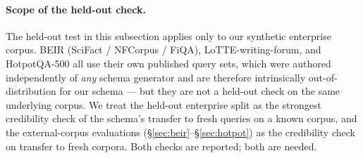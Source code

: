 \documentclass[11pt]{article}
\begin{document}
\paragraph{Scope of the held-out check.} The held-out test in this
subsection applies only to our synthetic enterprise corpus. BEIR
(SciFact / NFCorpus / FiQA), LoTTE-writing-forum, and HotpotQA-500
all use their own published query sets, which were authored
independently of \emph{any} schema generator and are therefore
intrinsically out-of-distribution for our schema --- but they are
not a held-out check on the same underlying corpus. We treat the
held-out enterprise split as the strongest credibility check of the
schema's transfer to fresh queries on a known corpus, and the
external-corpus evaluations (\S\ref{sec:beir}--\S\ref{sec:hotpot})
as the credibility check on transfer to fresh corpora. Both checks
are reported; both are needed.
\end{document}
